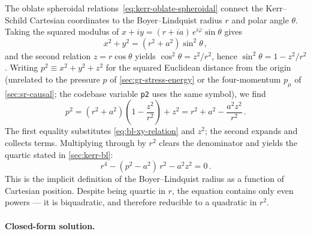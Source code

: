 The oblate spheroidal relations~\cref{eq:kerr-oblate-spheroidal}
connect the Kerr--Schild Cartesian coordinates to the
Boyer--Lindquist radius $r$ and polar angle $\theta$.  Taking the
squared modulus of $x + iy = (r + ia)\,e^{i\bar{\varphi}}\sin\theta$
gives
%
\begin{equation}
  x^2 + y^2 = (r^2 + a^2)\sin^2\!\theta \,,
  \label{eq:bl-xy-relation}
\end{equation}
%
and the second relation $z = r\cos\theta$ yields
$\cos^2\!\theta = z^2/r^2$, hence
$\sin^2\!\theta = 1 - z^2/r^2$.  Writing $p^2 \equiv x^2 + y^2 + z^2$
for the squared Euclidean distance from the origin (unrelated to the
pressure $p$ of \cref{sec:gr-stress-energy} or the four-momentum
$p_\mu$ of \cref{sec:sr-causal}; the codebase variable
\texttt{p2} uses the same symbol), we find
%
\begin{equation}
  p^2 = (r^2 + a^2)\!\left(1 - \frac{z^2}{r^2}\right) + z^2
      = r^2 + a^2 - \frac{a^2 z^2}{r^2} \,.
  \label{eq:bl-p2-relation}
\end{equation}
%
The first equality substitutes \cref{eq:bl-xy-relation} and $z^2$;
the second expands and collects terms.  Multiplying through by $r^2$
clears the denominator and yields the quartic stated in
\cref{sec:kerr-bl}:
%
\begin{equation}
  r^4 - (p^2 - a^2)\,r^2 - a^2 z^2 = 0 \,.
  \label{eq:bl-quartic-derived}
\end{equation}
%
This is the implicit definition of the Boyer--Lindquist radius as a
function of Cartesian position.  Despite being quartic in $r$, the
equation contains only even powers --- it is biquadratic, and
therefore reducible to a quadratic in $r^2$.

\paragraph{Closed-form solution.}

